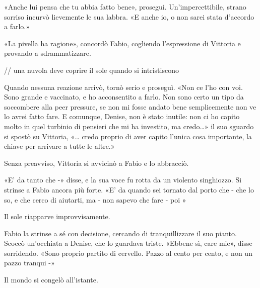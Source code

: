 «Anche lui pensa che tu abbia fatto bene», proseguì. Un'impercettibile, strano sorriso incurvò lievemente le sua labbra. «E anche io, o non sarei stata d'accordo a farlo.»

«La pivella ha ragione», concordò Fabio, cogliendo l'espressione di Vittoria e provando a sdrammatizzare.

// una nuvola deve coprire il sole quando si intristiscono

Quando nessuna reazione arrivò, tornò serio e proseguì. «Non ce l'ho con voi. Sono grande e vaccinato, e ho acconsentito a farlo. Non sono certo un tipo da soccombere alla peer pressure, se non mi fosse andato bene semplicemente non ve lo avrei fatto fare. E comunque, Denise, non è stato inutile: non ci ho capito molto in quel turbinio di pensieri che mi ha investito, ma credo\ldots{}» il suo sguardo si spostò su Vittoria, «\ldots{} credo proprio di aver capito l'unica cosa importante, la chiave per arrivare a tutte le altre.»

Senza preavviso, Vittoria si avvicinò a Fabio e lo abbracciò.

«E' da tanto che -» disse, e la sua voce fu rotta da un violento singhiozzo. Si strinse a Fabio ancora più forte. «E' da quando sei tornato dal porto che - che lo so, e che cerco di aiutarti, ma - non sapevo che fare - poi »

Il sole riapparve improvvisamente.

Fabio la strinse a sé con decisione, cercando di tranquillizzare il suo pianto. Scoccò un'occhiata a Denise, che lo guardava triste. «Ebbene sì, care mie», disse sorridendo. «Sono proprio partito di cervello. Pazzo al cento per cento, e non un pazzo tranqui -»

Il mondo si congelò all'istante.
